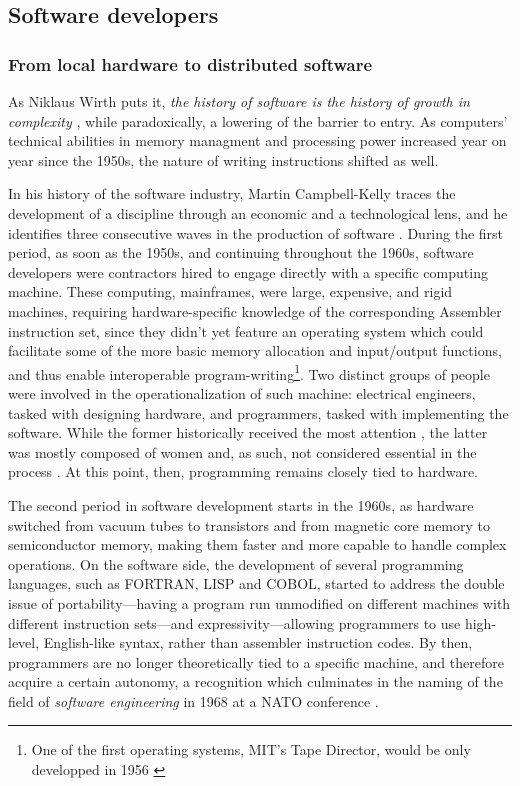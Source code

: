 \subsection{Software developers}
\label{subsec:software-developers}
\subsubsection{From local hardware to distributed software}

As Niklaus Wirth puts it, \emph{the history of software is the history of growth in complexity} \citep{wirth_brief_2008}, while paradoxically, a lowering of the barrier to entry. As computers' technical abilities in memory managment and processing power increased year on year since the 1950s, the nature of writing instructions shifted as well.

In his history of the software industry, Martin Campbell-Kelly traces the development of a discipline through an economic and a technological lens, and he identifies three consecutive waves in the production of software \citep{campbell-kelly_airline_2003}. During the first period, as soon as the 1950s, and continuing throughout the 1960s, software developers were contractors hired to engage directly with a specific computing machine. These computing, mainframes, were large, expensive, and rigid machines, requiring hardware-specific knowledge of the corresponding Assembler instruction set, since they didn't yet feature an operating system which could facilitate some of the more basic memory allocation and input/output functions, and thus enable interoperable program-writing\footnote{One of the first operating systems, MIT's Tape Director, would be only developped in 1956 \citep{ross_personal_1986}}. Two distinct groups of people were involved in the operationalization of such machine: electrical engineers, tasked with designing hardware, and programmers, tasked with implementing the software. While the former historically received the most attention \citep{ross_personal_1986}, the latter was mostly composed of women and, as such, not considered essential in the process \citep{light_when_1999}. At this point, then, programming remains closely tied to hardware.

The second period in software development starts in the 1960s, as hardware switched from vacuum tubes to transistors and from magnetic core memory to semiconductor memory, making them faster and more capable to handle complex operations.  On the software side, the development of several programming languages, such as FORTRAN, LISP and COBOL, started to address the double issue of portability—having a program run unmodified on different machines with different instruction sets—and expressivity—allowing programmers to use high-level, English-like syntax, rather than assembler instruction codes. By then, programmers are no longer theoretically tied to a specific machine, and therefore acquire a certain autonomy, a recognition which culminates in the naming of the field of \emph{software engineering} in 1968 at a NATO conference \citep{randell_nato_1996}.

